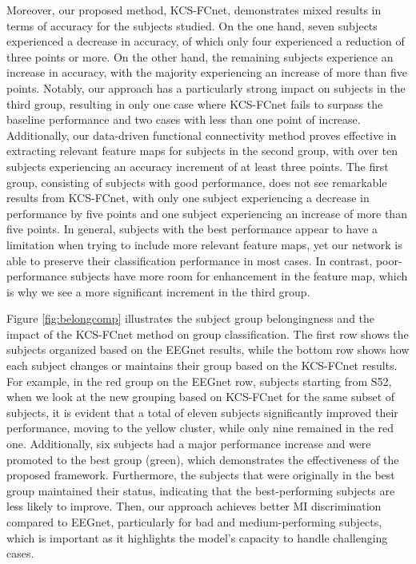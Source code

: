 Moreover, our proposed method, KCS-FCnet, demonstrates mixed results in terms of accuracy for the subjects studied. On the one hand, seven subjects experienced a decrease in accuracy, of which only four experienced a reduction of three points or more. On the other hand, the remaining subjects experience an increase in accuracy, with the majority experiencing an increase of more than five points. Notably, our approach has a particularly strong impact on subjects in the third group, resulting in only one case where KCS-FCnet fails to surpass the baseline performance and two cases with less than one point of increase. Additionally, our data-driven functional connectivity method proves effective in extracting relevant feature maps for subjects in the second group, with over ten subjects experiencing an accuracy increment of at least three points. The first group, consisting of subjects with good performance, does not see remarkable results from KCS-FCnet, with only one subject experiencing a decrease in performance by five points and one subject experiencing an increase of more than five points. In general, subjects with the best performance appear to have a limitation when trying to include more relevant feature maps, yet our network is able to preserve their classification performance in most cases. In contrast, poor-performance subjects have more room for enhancement in the feature map, which is why we see a more significant increment in the third group.
	
Figure \ref{fig:belongcomp} illustrates the subject group belongingness and the impact of the KCS-FCnet method on group classification. The first row shows the subjects organized based on the EEGnet results, while the bottom row shows how each subject changes or maintains their group based on the KCS-FCnet results. For example, in the red group on the EEGnet row, subjects starting from S52, when we look at the new grouping based on KCS-FCnet for the same subset of subjects, it is evident that a total of eleven subjects significantly improved their performance, moving to the yellow cluster, while only nine remained in the red one. Additionally, six subjects had a major performance increase and were promoted to the best group (green), which demonstrates the effectiveness of the proposed framework. Furthermore, the subjects that were originally in the best group maintained their status, indicating that the best-performing subjects are less likely to improve. Then, our approach achieves better MI discrimination compared to EEGnet, particularly for bad and medium-performing subjects, which is important as it highlights the model's capacity to handle challenging cases. 

